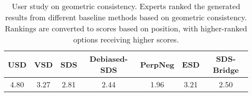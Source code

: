 



\begin{table}[t!]
    \centering
    \caption{User study on geometric consistency. Experts ranked the generated results from different baseline methods based on geometric consistency. Rankings are converted to scores based on position, with higher-ranked options receiving higher scores.}
    \begin{tabular}{ccccccc}
    \hline
    \textbf{USD} & \textbf{VSD} & \textbf{SDS} & \textbf{Debiased-SDS} & \textbf{PerpNeg} & \textbf{ESD} & \textbf{SDS-Bridge} \\ 
    \hline
    4.80 & 3.27 & 2.81 & 2.44 & 1.96 & 3.21 & 2.50 \\
    \hline
    \end{tabular}
    \label{table:app_userstudy}
\end{table}